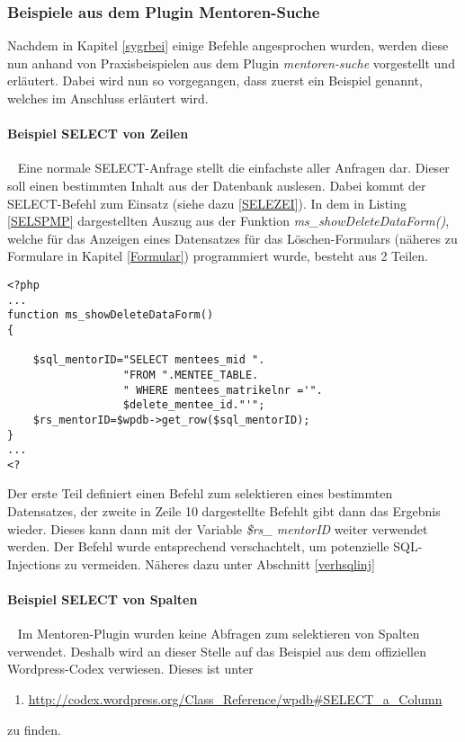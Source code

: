 \subsubsection{Beispiele aus dem Plugin Mentoren-Suche}\label{beiamensuc}
Nachdem in Kapitel \ref{sygrbei} einige Befehle angesprochen wurden, werden diese nun anhand von Praxisbeispielen aus dem Plugin \emph{mentoren-suche}  vorgestellt und erläutert. Dabei wird nun so vorgegangen, dass zuerst ein Beispiel genannt, welches im Anschluss erläutert wird.
\paragraph{Beispiel SELECT von Zeilen}\ \newline
Eine normale SELECT-Anfrage stellt die einfachste aller Anfragen dar. Dieser soll einen bestimmten Inhalt aus der Datenbank auslesen. Dabei kommt der SELECT-Befehl zum Einsatz (siehe dazu \ref{SELEZEI}).\newline
In dem in Listing \ref{SELSPMP} dargestellten Auszug aus der Funktion \emph{ms\_showDeleteDataForm()}, welche für  das Anzeigen eines Datensatzes für das Löschen-Formulars (näheres zu Formulare in Kapitel \ref{Formular}) programmiert wurde, besteht aus 2 Teilen. \newline
{}
\begin{lstlisting}
<?php
...
function ms_showDeleteDataForm()
{

    $sql_mentorID="SELECT mentees_mid ".
                  "FROM ".MENTEE_TABLE.   
                  " WHERE mentees_matrikelnr ='".
                  $delete_mentee_id."'";
    $rs_mentorID=$wpdb->get_row($sql_mentorID);
}
...
<?
\end{lstlisting}
Der erste Teil definiert einen Befehl zum selektieren eines bestimmten Datensatzes, der zweite in Zeile 10 dargestellte Befehlt gibt dann das Ergebnis wieder. Dieses kann dann mit der Variable  \emph{\$rs\_ mentorID} weiter verwendet werden.\newline
Der Befehl wurde entsprechend verschachtelt, um potenzielle SQL-Injections zu vermeiden. Näheres dazu unter Abschnitt \ref{verhsqlinj}
\paragraph{Beispiel SELECT von Spalten}\ \newline
Im Mentoren-Plugin wurden keine Abfragen zum selektieren von Spalten verwendet. Deshalb wird an dieser Stelle auf das Beispiel aus dem offiziellen Wordpress-Codex verwiesen. Dieses ist unter
\begin{enumerate}
	\item \url{http://codex.wordpress.org/Class_Reference/wpdb#SELECT_a_Column}
\end{enumerate}
zu finden.
